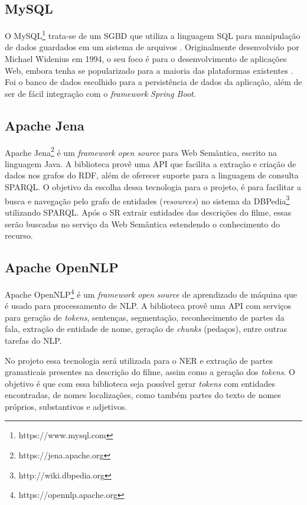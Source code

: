 \subsection{MySQL}

O MySQL\footnote{https://www.mysql.com} trata-se de um \ac{SGBD} que utiliza a linguagem \ac{SQL} para manipulação de dados guardados em um sistema de arquivos \citep{MySQLSGBD}. Originalmente desenvolvido por Michael Widenius em 1994, o seu foco é para o desenvolvimento de aplicações Web, embora tenha se popularizado para a maioria das plataformas existentes \citep{MySQLDevelopers}. Foi o banco de dados escolhido para a persistência de dados da aplicação, além de ser de fácil integração com o \textit{framework} \textit{Spring Boot}.

\subsection{Apache Jena}

Apache Jena\footnote{https://jena.apache.org} é um \textit{framework} \textit{open source} para Web Semântica, escrito na linguagem Java. A biblioteca provê uma \ac{API} que facilita a extração e criação de dados nos grafos do \ac{RDF}, além de oferecer suporte para a linguagem de consulta \ac{SPARQL}. O objetivo da escolha dessa tecnologia para o projeto, é para facilitar a busca e navegação pelo grafo de entidades (\textit{resources}) no sistema da DBPedia\footnote{http://wiki.dbpedia.org} utilizando \ac{SPARQL}. Após o \ac{SR} extrair entidades das descrições do filme, essas serão buscadas no serviço da Web Semântica estendendo o conhecimento do recurso.

\subsection{Apache OpenNLP}
\label{ssec:open_nlp}

Apache OpenNLP\footnote{https://opennlp.apache.org} é um \textit{framework} \textit{open source} de aprendizado de máquina que é usado para processamento de \ac{NLP}. A biblioteca provê uma \ac{API} com serviços para geração de \textit{tokens}, sentenças, segmentação, reconhecimento de partes da fala, extração de entidade de nome, geração de \textit{chunks} (pedaços), entre outras tarefas do \ac{NLP}.

No projeto essa tecnologia será utilizada para o \ac{NER} e extração de partes gramaticais presentes na descrição do filme, assim como a geração dos \textit{tokens}. O objetivo é que com essa biblioteca seja possível gerar \textit{tokens} com entidades encontradas, de nomes localizações, como também partes do texto de nomes próprios, substantivos e adjetivos.

